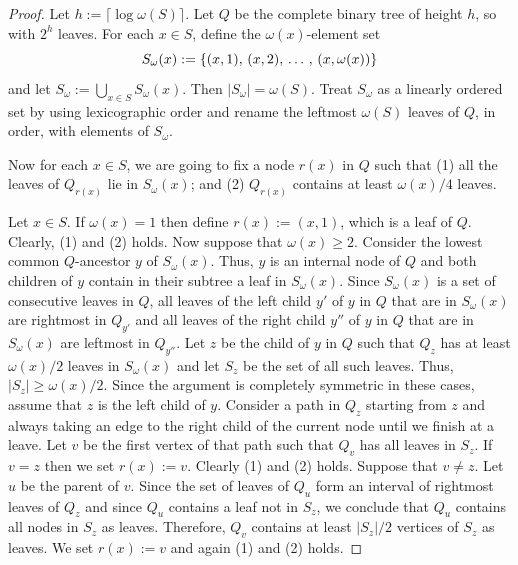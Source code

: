 \documentclass{patmorin}
\renewcommand{\geq}{\geqslant}
\DeclarePairedDelimiter{\set}{\{}{\}}
\begin{document}
   \begin{proof}
     Let $h:=\lceil\log\omega(S)\rceil$.
     Let $Q$ be the complete binary tree of height $h$, so with $2^h$ leaves. 
     For each $x\in S$, define the $\omega(x)$-element set
     \[  S_{\omega}(x):=\set{(x,1),\,(x,2),\,\ldots\,,\,(x,\omega(x))}\]
     and let $S_\omega:=\bigcup_{x\in S}S_{\omega}(x)$.  Then $|S_\omega|=\omega(S)$.  Treat $S_{\omega}$ as a linearly ordered set by using lexicographic order and rename the leftmost $\omega(S)$ leaves of $Q$, in order, with elements of $S_{\omega}$.

    Now for each $x\in S$, we are going to fix a node $r(x)$ in $Q$ such that 
    (1) all the leaves of $Q_{r(x)}$ lie in $S_{\omega}(x)$; and 
    (2) $Q_{r(x)}$ contains at least $\omega(x)/4$ leaves.

     Let $x\in S$.
     If $\omega(x)=1$ then define $r(x):=(x,1)$, which is a leaf of $Q$. 
     Clearly, (1) and (2) holds. 
     Now suppose that $\omega(x)\geq2$.
     Consider the lowest common $Q$-ancestor $y$ of $S_{\omega}(x)$.
     Thus, $y$ is an internal node of $Q$ and 
     both children of $y$ contain in their subtree a leaf in $S_{\omega}(x)$. 
     Since $S_{\omega}(x)$ is a set of consecutive leaves in $Q$, 
     all leaves of the left child $y'$ of $y$ in $Q$ that are in $S_{\omega}(x)$ are rightmost in $Q_{y'}$ and 
     all leaves of the right child $y''$ of $y$ in $Q$ that are in $S_{\omega}(x)$ are leftmost in $Q_{y''}$.
     Let $z$ be the child of $y$ in $Q$ such that $Q_z$ has at least $\omega(x)/2$ leaves in $S_{\omega}(x)$ and let $S_z$ be the set of all such leaves. 
     Thus, $|S_z|\geq \omega(x)/2$. 
     Since the argument is completely symmetric in these cases, assume that $z$ is the left child of $y$. 
     Consider a path in $Q_z$ starting from $z$ and always taking an edge to the right child of the current node until we finish at a leave. 
     Let $v$ be the first vertex of that path such that $Q_v$ has all leaves in $S_z$. 
     If $v=z$ then we set $r(x):=v$. Clearly (1) and (2) holds. 
     Suppose that $v\neq z$. 
     Let $u$ be the parent of $v$. 
     Since the set of leaves of $Q_u$ form an interval of rightmost leaves of $Q_z$ and since $Q_u$ contains a leaf not in $S_z$, we conclude that $Q_u$ contains all nodes in $S_z$ as leaves. 
     Therefore, $Q_v$ contains at least $|S_z|/2$ vertices of $S_z$ as leaves. 
     We set $r(x):=v$ and again (1) and (2) holds. 


\end{proof}
\end{document}
